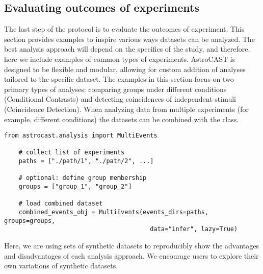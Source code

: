 \subsection{Evaluating outcomes of experiments}

The last step of the protocol is to evaluate the outcomes of experiment. This section provides examples to inspire various ways datasets can be analyzed. The best analysis approach will depend on the specifics of the study, and therefore, here we include examples of common types of experiments. AstroCAST is designed to be flexible and modular, allowing for custom addition of analyses tailored to the specific dataset. The examples in this section focus on two primary types of analyses: comparing groups under different conditions (Conditional Contrasts) and detecting coincidences of independent stimuli (Coincidence Detection). When analyzing data from multiple experiments (for example, different conditions) the datasets can be combined with the  class.

\begin{lstlisting}[style=pyStyle]
    from astrocast.analysis import MultiEvents

    # collect list of experiments
    paths = ["./path/1", "./path/2", ...]

    # optional: define group membership
    groups = ["group_1", "group_2"]

    # load combined dataset
    combined_events_obj = MultiEvents(events_dirs=paths, groups=groups,
                                        data="infer", lazy=True)
\end{lstlisting}

Here, we are using sets of synthetic datasets to reproducibly show the advantages and disadvantages of each analysis approach. We encourage users to explore their own variations of synthetic datasets.

